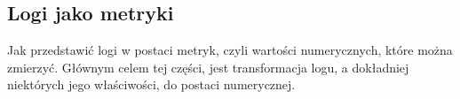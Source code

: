 \subsection{Logi jako metryki}
\label{chapter:application:plans:log_as_metrics}

Jak przedstawić logi w postaci metryk, czyli wartości numerycznych, które można zmierzyć.
Głównym celem tej części, jest transformacja logu, a dokładniej niektórych jego właściwości,
do postaci numerycznej.
